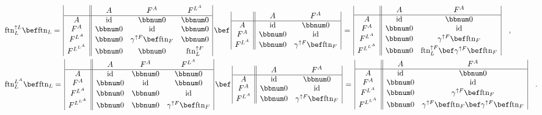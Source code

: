 \begin{align*}
 & \negthickspace\negthickspace\negthickspace\negthickspace\text{ftn}_{L}^{\uparrow L}\bef\text{ftn}_{L}=\,\begin{array}{|c||ccc|}
 & A & F^{A} & F^{L^{A}}\\
\hline A & \text{id} & \bbnum 0 & \bbnum 0\\
F^{A} & \bbnum 0 & \text{id} & \bbnum 0\\
F^{L^{A}} & \bbnum 0 & \gamma^{\uparrow F}\bef\text{ftn}_{F} & \bbnum 0\\
F^{L^{L^{A}}} & \bbnum 0 & \bbnum 0 & \text{ftn}_{L}^{\uparrow F}
\end{array}\,\bef\,\begin{array}{|c||cc|}
 & A & F^{A}\\
\hline A & \text{id} & \bbnum 0\\
F^{A} & \bbnum 0 & \text{id}\\
F^{L^{A}} & \bbnum 0 & \gamma^{\uparrow F}\bef\text{ftn}_{F}
\end{array}\,=\,\begin{array}{|c||cc|}
 & A & F^{A}\\
\hline A & \text{id} & \bbnum 0\\
F^{A} & \bbnum 0 & \text{id}\\
F^{L^{A}} & \bbnum 0 & \gamma^{\uparrow F}\bef\text{ftn}_{F}\\
F^{L^{L^{A}}} & \bbnum 0 & \text{ftn}_{L}^{\uparrow F}\bef\gamma^{\uparrow F}\bef\text{ftn}_{F}
\end{array}\quad,\\
 & \negthickspace\negthickspace\negthickspace\negthickspace\text{ftn}_{L}^{L^{A}}\bef\text{ftn}_{L}=\,\begin{array}{|c||ccc|}
 & A & F^{A} & F^{L^{A}}\\
\hline A & \text{id} & \bbnum 0 & \bbnum 0\\
F^{A} & \bbnum 0 & \text{id} & \bbnum 0\\
F^{L^{A}} & \bbnum 0 & \bbnum 0 & \text{id}\\
F^{L^{L^{A}}} & \bbnum 0 & \bbnum 0 & \gamma^{\uparrow F}\bef\text{ftn}_{F}
\end{array}\,\bef\,\begin{array}{|c||cc|}
 & A & F^{A}\\
\hline A & \text{id} & \bbnum 0\\
F^{A} & \bbnum 0 & \text{id}\\
F^{L^{A}} & \bbnum 0 & \gamma^{\uparrow F}\bef\text{ftn}_{F}
\end{array}\,=\,\begin{array}{|c||cc|}
 & A & F^{A}\\
\hline A & \text{id} & \bbnum 0\\
F^{A} & \bbnum 0 & \text{id}\\
F^{L^{A}} & \bbnum 0 & \gamma^{\uparrow F}\bef\text{ftn}_{F}\\
F^{L^{L^{A}}} & \bbnum 0 & \gamma^{\uparrow F}\bef\text{ftn}_{F}\bef\gamma^{\uparrow F}\bef\text{ftn}_{F}
\end{array}\quad.
\end{align*}
